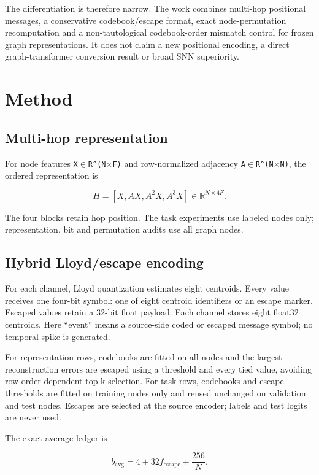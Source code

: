 \documentclass{article}
\begin{document}
The differentiation is therefore narrow. The work combines multi-hop positional messages, a conservative codebook/escape format, exact node-permutation recomputation and a non-tautological codebook-order mismatch control for frozen graph representations. It does not claim a new positional encoding, a direct graph-transformer conversion result or broad SNN superiority.

\section{Method}


\subsection{Multi-hop representation}


For node features \texttt{X$\in$R\textasciicircum{}(N$\times$F)} and row-normalized adjacency \texttt{A$\in$R\textasciicircum{}(N$\times$N)}, the ordered representation is

\[
H = [X, AX, A^2X, A^3X] \in \mathbb{R}^{N\times 4F}.
\]

The four blocks retain hop position. The task experiments use labeled nodes only; representation, bit and permutation audits use all graph nodes.

\subsection{Hybrid Lloyd/escape encoding}


For each channel, Lloyd quantization estimates eight centroids. Every value receives one four-bit symbol: one of eight centroid identifiers or an escape marker. Escaped values retain a 32-bit float payload. Each channel stores eight float32 centroids. Here ``event'' means a source-side coded or escaped message symbol; no temporal spike is generated.

For representation rows, codebooks are fitted on all nodes and the largest reconstruction errors are escaped using a threshold and every tied value, avoiding row-order-dependent top-k selection. For task rows, codebooks and escape thresholds are fitted on training nodes only and reused unchanged on validation and test nodes. Escapes are selected at the source encoder; labels and test logits are never used.

The exact average ledger is

\[
b_{\mathrm{avg}} = 4 + 32 f_{\mathrm{escape}} + \frac{256}{N}.
\]
\end{document}
